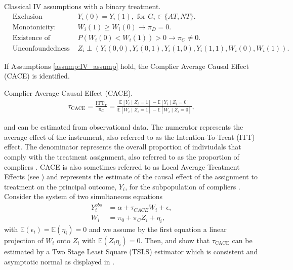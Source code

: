 \begin{assump}{Classical IV assumptions with a binary treatment.}
   \label{assump:IV_assump} 
   \begin{align*}
      &\text{Exclusion restriction: }& Y_i(0) = Y_i(1), \text{ for } G_i \in \{AT, NT \}. \\
      &\text{Monotonicity: }& W_i(1) \geq W_i(0) \rightarrow \pi_D = 0. \\
      &\text{Existence of compliers: }& P(W_i(0) < W_i(1)) > 0 \rightarrow \pi_C \ne 0. \\
      &\text{Unconfoundedness of IV: }& Z_i \perp (Y_i(0, 0), Y_i(0, 1), Y_i(1, 0), Y_i(1, 1), W_i(0), W_i(1)). 
   \end{align*}
\end{assump}

If Assumptions \ref{assump:IV_assump} hold, the Complier Average Causal Effect (CACE) is identified.

\begin{defn}{Complier Average Causal Effect (CACE).}
   \label{defn:CACE}
   \begin{align*}
      \tau_{\text{CACE}} = \frac{\text{ITT}_{Y}}{\pi_C} = \frac{\mathbb{E}[Y_i \mid Z_i = 1] - \mathbb{E}[Y_i \mid Z_i = 0]}{\mathbb{E}[W_i \mid Z_i = 1] - \mathbb{E}[W_i \mid Z_i = 0]},
   \end{align*}
\end{defn}

and can be estimated from observational data. The numerator represents the average effect of the instrument, also referred to as the Intention-To-Treat (ITT) effect. 
The denominator represents the overall proportion of indiviudals that comply with the treatment assignment, also referred to as the proportion of compliers \cite{Angrist1996}.
CACE is also sometimes referred to as Local Average Treatment Effects (see \cite{AngristPischke2008}) and represents the estimate of the causal effect of the assignment to treatment on the principal outcome, $Y_i$, for the subpopulation of compliers \cite{ImbensRubin2015}. Consider the system of two simultaneous equations 
\begin{align*}
Y_i^{obs} &= \alpha + \tau_{CACE} W_i + \epsilon, \\
W_i &= \pi_0 + \pi_C Z_i + \eta_i,
\end{align*}
with $\mathbb{E}\left(\epsilon_i \right) = \mathbb{E}\left(\eta_i \right) = 0$ and we assume by the first equation a linear projection of $W_i$ onto $Z_i$ with $\mathbb{E}\left(Z_i \eta_i\right)=0$. Then, \cite{Angrist1996} and \cite{ImbensRubin2015} show that $\tau_{\text{CACE}}$ can be estimated by a Two Stage Least Square (TSLS) estimator which is consistent and asymptotic normal as displayed in \cite{Wooldridge2015}.   

